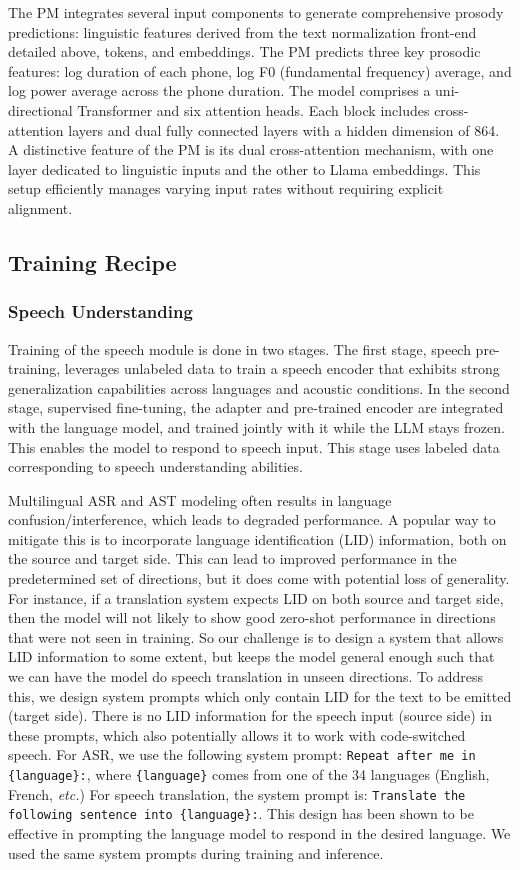 The PM integrates several input components to generate comprehensive prosody predictions: linguistic features derived from the text normalization front-end detailed above, tokens, and embeddings. The PM predicts three key prosodic features: log duration of each phone, log F0 (fundamental frequency) average, and log power average across the phone duration. The model comprises a uni-directional Transformer and six attention heads. Each block includes cross-attention layers and dual fully connected layers with a hidden dimension of 864. A distinctive feature of the PM is its dual cross-attention mechanism, with one layer dedicated to linguistic inputs and the other to Llama embeddings. This setup efficiently manages varying input rates without requiring explicit alignment.

\subsection{Training Recipe}

\subsubsection{Speech Understanding}

Training of the speech module is done in two stages. The first stage, speech pre-training, leverages unlabeled data to train a speech encoder that exhibits strong generalization capabilities across languages and acoustic conditions. In the second stage, supervised fine-tuning, the adapter and pre-trained encoder are integrated with the language model, and trained jointly with it while the LLM stays frozen. This enables the model to respond to speech input. This stage uses labeled data corresponding to speech understanding abilities.

Multilingual ASR and AST modeling often results in language confusion/interference, which leads to degraded performance. A popular way to mitigate this is to incorporate language identification (LID) information, both on the source and target side. This can lead to improved performance in the predetermined set of directions, but it does come with potential loss of generality. For instance, if a translation system expects LID on both source and target side, then the model will not likely to show good zero-shot performance in directions that were not seen in training. So our challenge is to design a system that allows LID information to some extent, but keeps the model general enough such that we can have the model do speech translation in unseen directions. To address this, we design system prompts which only contain LID for the text to be emitted (target side). There is no LID information for the speech input (source side) in these prompts, which also potentially allows it to work with code-switched speech. For ASR, we use the following system prompt: {\tt Repeat after me in \{language\}:},
where {\tt \{language\}} comes from one of the 34 languages (English, French, \emph{etc.})
For speech translation, the system prompt is: {\tt Translate the following sentence into \{language\}:}.
This design has been shown to be effective in prompting the language model to respond in the desired language. We used the same system prompts during training and inference.

